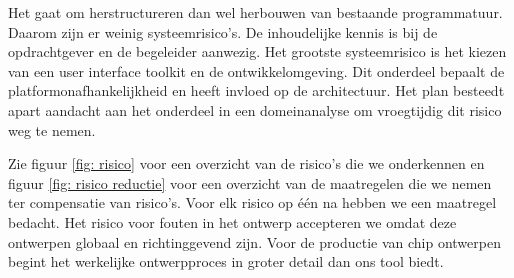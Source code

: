 Het gaat om herstructureren dan wel herbouwen van bestaande programmatuur. Daarom zijn er weinig systeemrisico's.
De inhoudelijke kennis is bij de opdrachtgever en de begeleider aanwezig. Het grootste systeemrisico is het kiezen
van een user interface toolkit en de ontwikkelomgeving. Dit onderdeel bepaalt de platformonafhankelijkheid
en heeft invloed op de architectuur. Het plan besteedt apart aandacht aan het onderdeel in een domeinanalyse om
vroegtijdig dit risico weg te nemen.

Zie figuur \ref{fig: risico} voor een overzicht van de risico's die we onderkennen en figuur \ref{fig: risico reductie} voor
een overzicht van de maatregelen die we nemen ter compensatie van risico's. Voor elk risico op \'e\'en na hebben we een
maatregel bedacht. Het risico voor fouten in het ontwerp accepteren we omdat deze ontwerpen globaal en richtinggevend zijn.
Voor de productie van chip ontwerpen begint het werkelijke ontwerpproces in groter detail dan ons tool biedt.

